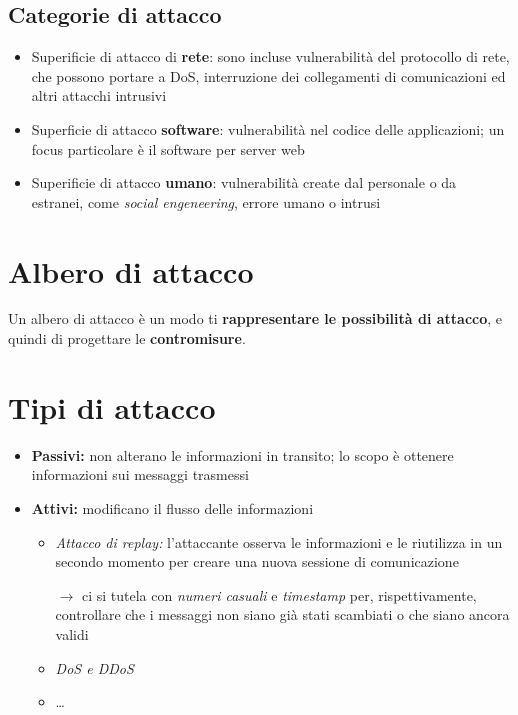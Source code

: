 \subsection{Categorie di attacco}
\begin{itemize}
    \item Superificie di attacco di \textbf{rete}: sono incluse vulnerabilità del protocollo
    di rete, che possono portare a DoS, interruzione dei collegamenti di comunicazioni ed altri 
    attacchi intrusivi
    \item Superficie di attacco \textbf{software}: vulnerabilità nel codice delle applicazioni; un focus 
    particolare è il software per server web 
    \item Superificie di attacco \textbf{umano}: vulnerabilità create dal personale o da estranei, come 
    \textit{social engeneering}, errore umano o intrusi
\end{itemize}

\section{Albero di attacco}
Un albero di attacco è un modo ti \textbf{rappresentare le possibilità di attacco}, e quindi
di progettare le \textbf{contromisure}.

\section{Tipi di attacco}
\begin{itemize}
    \item \textbf{Passivi:} non alterano le informazioni in transito; lo scopo è ottenere 
    informazioni sui messaggi trasmessi
    \item \textbf{Attivi:} modificano il flusso delle informazioni 
    \begin{itemize}
        \item \textit{Attacco di replay:} l'attaccante osserva le informazioni e le riutilizza 
        in un secondo momento per creare una nuova sessione di comunicazione

        $\rightarrow$ ci si tutela con \textit{numeri casuali} e \textit{timestamp} per, rispettivamente,
        controllare che i messaggi non siano già stati scambiati o che siano ancora validi
        \item \textit{DoS e DDoS}
        \item \dots
    \end{itemize}
\end{itemize}

